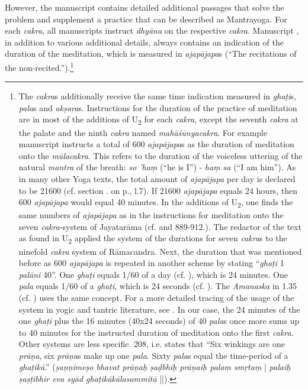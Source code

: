   However, the manuscript  contains detailed additional passages that solve the problem and supplement a practice that can be described as Mantrayoga. For each \textit{cakra}, all manuscripts instruct \textit{dhyāna} on the respective \textit{cakra}. Manuscript , in addition to various additional details, always contains an indication of the duration of the meditation, which is measured in \textit{ajapājapa}s (``The recitations of the non-recited.'').\footnote{The \textit{cakra}s additionally receive the same time indication measured in \textit{ghaṭi}s, \textit{pala}s and \textit{akṣara}s. Instructions for the duration of the practice of meditation are in most of the additions of U\textsubscript{2} for each \textit{cakra}, except the seventh \textit{cakra} at the palate and the ninth \textit{cakra} named \textit{mahāśūnyacakra}. For example manuscript  instructs a total of 600 \textit{ajapājapa}s as the duration of meditation onto the \textit{mūlacakra}. This refers to the duration of the voiceless uttering of the natural \textit{mantra} of the breath: \textit{so 'haṃ} (``he is I'') - \textit{haṃ sa} (``I am him''). As in many other Yoga texts, the total amount of \textit{ajapājapa} per day is declared to be 21600 (cf. section . on p.\pageref{cakra8}, l.7). If 21600 \textit{ajapājapa} equals 24 hours, then 600 \textit{ajapājapa} would equal 40 minutes. In the additions of U\textsubscript{2}, one finds the same numbers of \textit{ajapājapa} as in the instructions for meditation onto the seven \textit{cakra}-system of Jayatarāma (cf. \citeauthor[2006: 163]{jogpradipyaka} and  889-912.). The redactor of the text as found in U\textsubscript{2} applied the system of the durations for seven \textit{cakra}s to the ninefold \textit{cakra} system of Rāmacandra. Next, the duration that was mentioned before as 600 \textit{ajapājapa} is repeated in another scheme by stating ``\textit{ghaṭi} 1 \textit{palāni} 40''. One \textit{ghaṭi} equals 1/60 of a day (cf. \citeauthor[1966: 114]{sircar1966}), which is 24 minutes. One \textit{pala} equals 1/60 of a \textit{ghaṭi}, which is 24 seconds (cf. \citeauthor[1858: 4]{petersburger4}). The \textit{Amanaska} in 1.35 (cf. \citeauthor[2013: 231]{birch2013}) uses the same concept. For a more detailed tracing of the usage of the system in yogic and tantric literature, see \citeauthor[2013: 265, endnote 46]{birch2013}. In our case, the 24 minutes of the one \textit{ghaṭi} plus the 16 minutes (40x24 seconds) of 40 \textit{pala}s once more sums up to 40 minutes for the instructed duration of meditation onto the first \textit{cakra}. Other systems are less specific.  208, i.e. states that ``Six winkings are one \textit{prāṇa}, six \textit{prāṇa}s make up one \textit{pala}. Sixty \textit{pala}s equal the time-period of a \textit{ghaṭikā}.'' (\textit{ṣaṇṇimeṣo bhavat prāṇaḥ ṣaḍbhiḥ prāṇaiḥ palaṃ smṛtaṃ} | \textit{palaiḥ ṣaṣṭibhir eva syād ghaṭikākālasammitā} ||).
}
